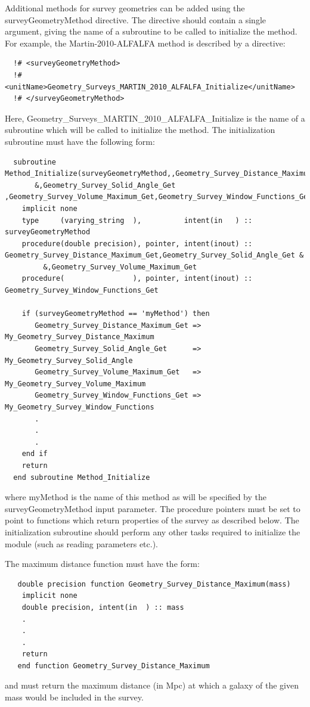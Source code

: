 Additional methods for survey geometries can be added using the {\normalfont \ttfamily surveyGeometryMethod} directive. The directive should contain a single argument, giving the name of a subroutine to be called to initialize the method. For example, the {\normalfont \ttfamily Martin-2010-ALFALFA} method is described by a directive:
\begin{verbatim}
  !# <surveyGeometryMethod>
  !#  <unitName>Geometry_Surveys_MARTIN_2010_ALFALFA_Initialize</unitName>
  !# </surveyGeometryMethod>
\end{verbatim}
Here, {\normalfont \ttfamily Geometry\_Surveys\_MARTIN\_2010\_ALFALFA\_Initialize} is the name of a subroutine which will be called to initialize the method. The initialization subroutine must have the following form:
\begin{verbatim}
  subroutine Method_Initialize(surveyGeometryMethod,,Geometry_Survey_Distance_Maximum_Get&
       &,Geometry_Survey_Solid_Angle_Get ,Geometry_Survey_Volume_Maximum_Get,Geometry_Survey_Window_Functions_Get)
    implicit none
    type     (varying_string  ),          intent(in   ) :: surveyGeometryMethod
    procedure(double precision), pointer, intent(inout) :: Geometry_Survey_Distance_Maximum_Get,Geometry_Survey_Solid_Angle_Get &
         &,Geometry_Survey_Volume_Maximum_Get
    procedure(                ), pointer, intent(inout) :: Geometry_Survey_Window_Functions_Get

    if (surveyGeometryMethod == 'myMethod') then
       Geometry_Survey_Distance_Maximum_Get => My_Geometry_Survey_Distance_Maximum
       Geometry_Survey_Solid_Angle_Get      => My_Geometry_Survey_Solid_Angle
       Geometry_Survey_Volume_Maximum_Get   => My_Geometry_Survey_Volume_Maximum
       Geometry_Survey_Window_Functions_Get => My_Geometry_Survey_Window_Functions
       .
       .
       .
    end if
    return
  end subroutine Method_Initialize
\end{verbatim}
where {\normalfont \ttfamily myMethod} is the name of this method as will be specified by the {\normalfont \ttfamily surveyGeometryMethod} input parameter. The procedure pointers  must be set to point to functions which return properties of the survey as described below. The initialization subroutine should perform any other tasks required to initialize the module (such as reading parameters etc.).

The maximum distance function must have the form:
\begin{verbatim}
   double precision function Geometry_Survey_Distance_Maximum(mass)
    implicit none
    double precision, intent(in  ) :: mass
    .
    .
    .
    return
   end function Geometry_Survey_Distance_Maximum 
\end{verbatim}
and must return the maximum distance (in Mpc) at which a galaxy of the given {\normalfont \ttfamily mass} would be included in the survey.

